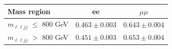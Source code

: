 \begin{table}[htp]
  \label{tab:emu_tf_resolved_RunIII2024Summer24}
  \centering
  \begin{tabular}{l | c c}
    \hline
    Mass region & ee & $\mu\mu$ \\
    \hline
    $m_{\ell\ell jj}$ $\leq$ 800 GeV & $0.463 \pm 0.003$ & $0.643 \pm 0.004$ \\
    $m_{\ell\ell jj}$ $>$ 800 GeV & $0.451 \pm 0.003$ & $0.653 \pm 0.004$ \\
    \hline
  \end{tabular}
\end{table}
